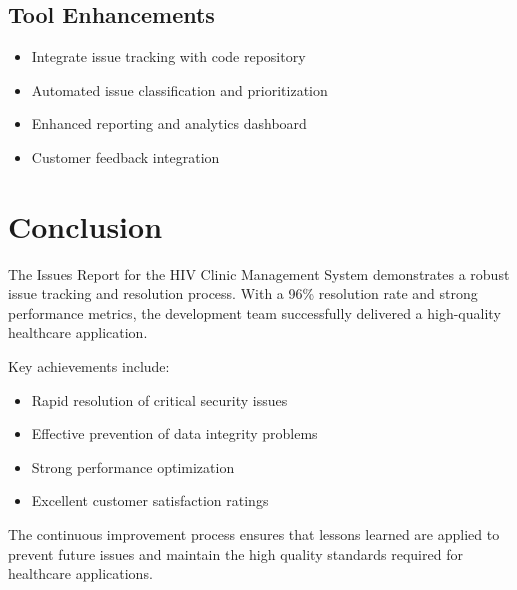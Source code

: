 \documentclass[12pt,a4paper]{article}
\begin{document}
\subsection{Tool Enhancements}

\begin{itemize}
    \item Integrate issue tracking with code repository
    \item Automated issue classification and prioritization
    \item Enhanced reporting and analytics dashboard
    \item Customer feedback integration
\end{itemize}

\section{Conclusion}

The Issues Report for the HIV Clinic Management System demonstrates a robust issue tracking and resolution process. With a 96\% resolution rate and strong performance metrics, the development team successfully delivered a high-quality healthcare application.

Key achievements include:
\begin{itemize}
    \item Rapid resolution of critical security issues
    \item Effective prevention of data integrity problems
    \item Strong performance optimization
    \item Excellent customer satisfaction ratings
\end{itemize}

The continuous improvement process ensures that lessons learned are applied to prevent future issues and maintain the high quality standards required for healthcare applications.
\end{document}
